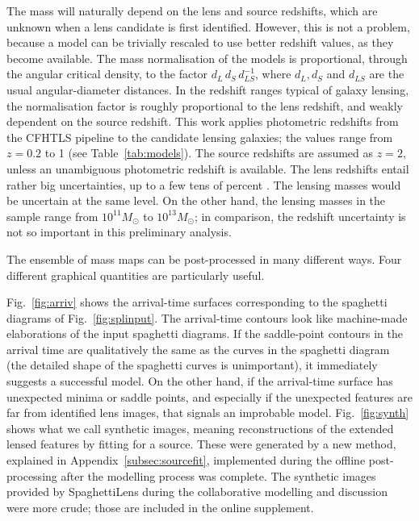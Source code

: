 The mass will naturally depend on the lens and source redshifts, which
are unknown when a lens candidate is first identified.  However, this
is not a problem, because a model can be trivially rescaled to use
better redshift values, as they become available.  The mass
normalisation of the models is proportional, through the angular
critical density, to the factor $d_L\, d_S\, d_{LS}^{-1}$, where
$d_L,d_S$ and $d_{LS}$ are the usual angular-diameter distances.  In
the redshift ranges typical of galaxy lensing, the normalisation
factor is roughly proportional to the lens redshift, and weakly
dependent on the source redshift.  This work applies photometric
redshifts from the CFHTLS pipeline \citep{2009A&A...500..981C} to the
candidate lensing galaxies; the values range from $z=0.2$ to 1 (see
Table~\ref{tab:models}).  The source redshifts are assumed as $z=2$,
unless an unambiguous photometric redshift is available.  The lens
redshifts entail rather big uncertainties, up to a few tens of percent
\citep[see Fig.~5 in][]{2009A&A...500..981C}. The lensing masses would
be uncertain at the same level.  On the other hand, the lensing masses
in the sample range from $10^{11}M_\odot$ to $10^{13}M_\odot$; in
comparison, the redshift uncertainty is not so important in this
preliminary analysis.

The ensemble of mass maps can be post-processed in many different
ways.  Four different graphical quantities are particularly useful.

Fig.~\ref{fig:arriv} shows the arrival-time surfaces corresponding to
the spaghetti diagrams of Fig.~\ref{fig:splinput}.  The arrival-time
contours look like machine-made elaborations of the input spaghetti
diagrams.  If the saddle-point contours in the arrival time are
qualitatively the same as the curves in the spaghetti diagram (the
detailed shape of the spaghetti curves is unimportant), it immediately
suggests a successful model.  On the other hand, if the arrival-time
surface has unexpected minima or saddle points, and especially if the
unexpected features are far from identified lens images, that signals
an improbable model.  Fig.~\ref{fig:synth} shows what we call synthetic
images, meaning reconstructions of the extended lensed features by
fitting for a source.  These were generated by a new method, explained
in Appendix~\ref{subsec:sourcefit}, implemented during the offline
post-processing after the modelling process was complete.  The
synthetic images provided by SpaghettiLens during the collaborative
modelling and discussion were more crude; those are included in the
online supplement.

